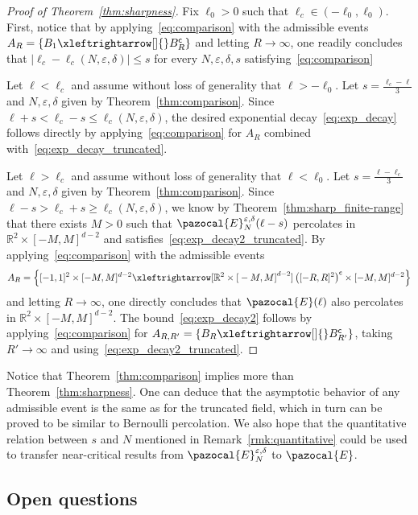 \documentclass[AHL,Unicode,longabstracts,published]{cedram}
\newcommand{\R}{\mathbb{R}}
\newcommand{\sfc}{\mathsf{c}}
\newcommand{\lr}[4]{#3\xleftrightarrow[#1]{#2} #4}
\newcommand{\R}{\mathbb{R}}
\begin{document}
\begin{proof}[Proof of Theorem~\ref{thm:sharpness}]
Fix $\ell_0>0$ such that $\ell_c\in(-\ell_0,\ell_0)$. First, notice that by applying~\eqref{eq:comparison} with the admissible events $A_R=\{\lr{}{}{B_1}{B_R^{\sfc}}\}$ and letting $R\to\infty$, one readily concludes that $|\ell_c-\ell_c(N,\varepsilon,\delta)|\leq s$ for every $N,\varepsilon,\delta, s$ satisfying~\eqref{eq:comparison}

Let $\ell<\ell_c$ and assume without loss of generality that $\ell>-\ell_0$. Let $s=\frac{\ell_c-\ell}{3}$ and $N,\varepsilon,\delta$ given by Theorem~\ref{thm:comparison}. Since $\ell+s<\ell_c-s\leq \ell_c(N,\varepsilon,\delta)$, the desired exponential decay~\eqref{eq:exp_decay} follows directly by applying~\eqref{eq:comparison} for $A_R$ combined with~\eqref{eq:exp_decay_truncated}.

Let $\ell>\ell_c$ and assume without loss of generality that $\ell<\ell_0$. Let $s=\frac{\ell-\ell_c}{3}$ and $N,\varepsilon,\delta$ given by Theorem~\ref{thm:comparison}. Since $\ell-s>\ell_c+s\geq \ell_c(N,\varepsilon,\delta)$, we know by Theorem~\ref{thm:sharp_finite-range} that there exists $M>0$ such that $\pazocal{E}_N^{\varepsilon,\delta}(\ell-s)$ percolates in $\R^2\times[-M,M]^{d-2}$ and satisfies~\eqref{eq:exp_decay2_truncated}. By applying~\eqref{eq:comparison} with the admissible events 
\[
{A_R=\left\{\lr{\R^2\times{[}-M,M{]}^{d-2}}{}{[-1,1]^2\times[-M,M]^{d-2}}{\left([-R,R]^2\right)^{\sfc}\times[-M,M]^{d-2}}\right\}}
\]
and letting $R\to\infty$, one directly concludes that $\pazocal{E}(\ell)$ also percolates in $\R^2\times[-M,M]^{d-2}$. The bound~\eqref{eq:exp_decay2} follows by applying~\eqref{eq:comparison} for $A_{R,R'}=\{\lr{}{}{B_R}{B_{R'}^{\sfc}}\}$, taking $R'\to\infty$ and using~\eqref{eq:exp_decay2_truncated}.
\end{proof}

\begin{rema}\label{rmk:supercritical}
Notice that Theorem~\ref{thm:comparison} implies more than Theorem~\ref{thm:sharpness}. One can deduce that the asymptotic behavior of any admissible event is the same as for the truncated field, which in turn can be proved to be similar to Bernoulli percolation. We also hope that the quantitative relation between $s$ and $N$ mentioned in Remark~\ref{rmk:quantitative} could be used to transfer near-critical results from $\pazocal{E}^{\varepsilon,\delta}_N$ to $\pazocal{E}$.
\end{rema}


\subsection{Open questions}
\end{document}
